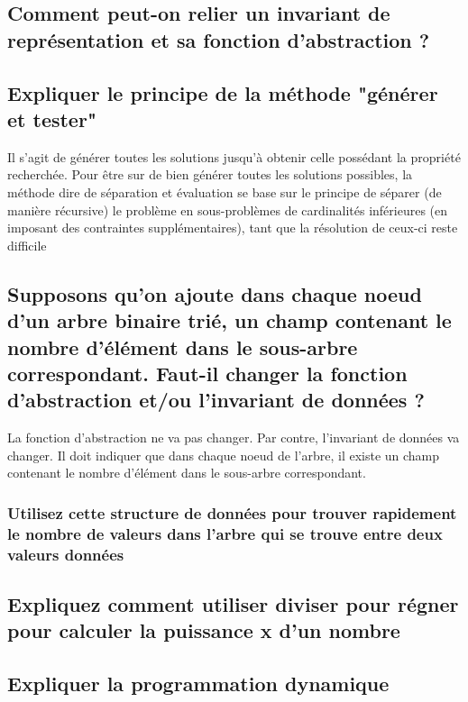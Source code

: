 \documentclass[11pt]{article}
\begin{document}
\subsection{Comment peut-on relier un invariant de représentation et sa fonction d'abstraction ?}

\subsection{Expliquer le principe de la méthode "générer et tester"}

Il s’agit de générer toutes les solutions jusqu’à obtenir celle possédant la propriété recherchée. Pour être sur de bien générer toutes les solutions possibles, la méthode dire de séparation et évaluation se base sur le principe de séparer (de manière récursive) le problème en sous-problèmes de cardinalités inférieures (en imposant des contraintes supplémentaires), tant que la résolution de ceux-ci reste difficile

\subsection{Supposons qu'on ajoute dans chaque noeud d'un arbre binaire trié, un champ contenant le nombre d'élément dans le sous-arbre correspondant. Faut-il changer la fonction d'abstraction et/ou l'invariant de données ?}

La fonction d'abstraction ne va pas changer. Par contre, l'invariant de données va changer. Il doit indiquer que dans chaque noeud de l'arbre, il existe un champ contenant le nombre d'élément dans le sous-arbre correspondant.

\subsubsection{Utilisez cette structure de données pour trouver rapidement le nombre de valeurs dans l'arbre qui se trouve entre deux valeurs données}

\subsection{Expliquez comment utiliser diviser pour régner pour calculer la puissance x d'un nombre}

\subsection{Expliquer la programmation dynamique}
\end{document}
